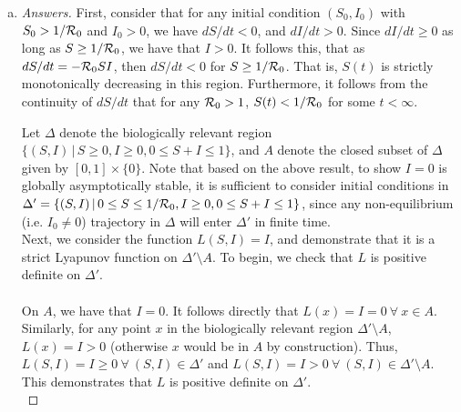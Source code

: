 \documentclass[12pt]{article}
\begin{document}
\begin{enumerate}[(a)]
\begin{enumerate}[(i)]
  \end{enumerate}
\item \basicSIRanalQc

{\color{blue}
\begin{proof}[Answers]
First, consider that for any initial condition $(S_0, I_0)$ with $S_0 > 1/{\cal R}_0$ and $I_0 >0$, we have $dS/dt < 0$, and $dI/dt > 0$. Since $dI/dt \geq 0$ as long as $S \geq 1/{\cal R}_0$, we have that $I >0$. It follows this, that as $dS/dt=-{\cal R}_0SI$, then $dS/dt < 0$ for $S \geq 1/{\cal R}_0$. That is, $S(t)$ is strictly monotonically decreasing in this region. Furthermore, it follows from the continuity of $dS/dt$ that for any $ {\cal R}_0 > 1$, $S(t) < 1/{\cal R}_0$ for some $t < \infty$.



Let $\Delta$ denote the biologically relevant region $ \{ (S, I) \, | \, S \geq 0, I \geq 0, 0 \leq S+I \leq 1 \}$, and $A$ denote the closed subset of $\Delta$ given by $[0, 1] \times \{0\}$. Note that based on the above result, to show $I =0$ is globally asymptotically stable, it is sufficient to consider initial conditions in $\Delta' = \{ (S, I) \, | \, 0 \leq S \leq 1/{\cal R}_0, I \geq 0, 0 \leq S+I \leq 1 \}$, since any non-equilibrium (i.e. $I_0 \neq 0$) trajectory in $\Delta$ will enter $\Delta'$ in finite time.\\

Next, we consider the function $L(S,I)=I$, and demonstrate that it is a strict Lyapunov function on $\Delta' \setminus A$. To begin, we check that $L$ is positive definite on $\Delta'$.\\\\
On $A$, we have that $I = 0$. It follows directly that $L(x)= I = 0 \ \forall \ x \in A$. Similarly, for any point $x$ in the biologically relevant region $\Delta' \setminus A$, $L(x) = I > 0$ (otherwise $x$ would be in $A$ by construction). Thus, $L(S,I)=I \geq 0 \ \forall \ (S,I) \in \Delta'$ and $L(S,I)=I > 0 \ \forall \ (S,I) \in \Delta' \setminus A$. This demonstrates that $L$ is positive definite on $\Delta'$.\\


\end{proof}}
\end{enumerate}
\end{document}
